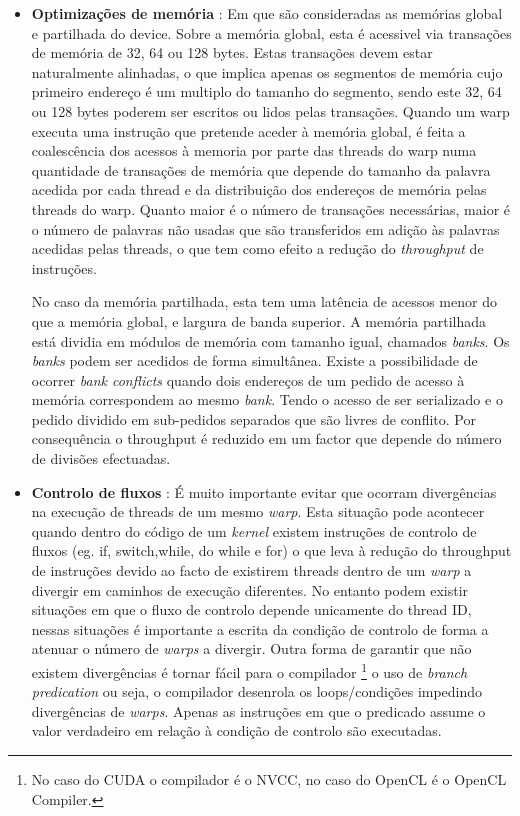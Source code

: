 \begin{itemize}
\item {\textbf{Optimizações de memória}} : Em que são consideradas as memórias global e partilhada do device.
Sobre a memória global, esta é acessivel via transações de memória de 32, 64 ou 128 bytes. Estas transações devem estar naturalmente alinhadas, o que implica apenas os segmentos de memória cujo primeiro endereço é um multiplo do tamanho do segmento, sendo este 32, 64 ou 128 bytes poderem ser escritos ou lidos pelas transações.
 Quando um warp executa uma instrução que pretende aceder à memória global, é feita a coalescência dos acessos à memoria por parte das threads do warp numa quantidade de transações de memória que depende do tamanho da palavra acedida por cada thread e da distribuição dos endereços de memória pelas threads do warp. Quanto maior é o número de transações necessárias, maior é o número de palavras não usadas que são transferidos em adição às palavras acedidas pelas threads, o que tem como efeito a redução do \textit{throughput} de instruções\cite{cpg}. \par

No caso da memória partilhada, esta tem uma latência de acessos menor do que a memória global, e largura de banda superior. A memória partilhada está dividia em módulos de memória com tamanho igual, chamados \textit{banks}. Os \textit{banks} podem ser acedidos de forma simultânea. Existe a possibilidade de ocorrer \textit{bank conflicts} quando dois endereços de um pedido de acesso à memória correspondem ao mesmo \textit{bank}.  Tendo o acesso de ser serializado e o pedido dividido em sub-pedidos separados que são livres de conflito. Por consequência o throughput é reduzido em um factor que depende do número de divisões efectuadas.

\item{\textbf{Controlo de fluxos}} : É muito importante evitar que ocorram divergências na execução de threads de um mesmo \textit{warp}. Esta situação pode acontecer quando dentro do código de um \textit{kernel} existem instruções de controlo de fluxos (eg. if, switch,while, do while e for) o que leva à redução do throughput de instruções devido ao facto de existirem threads dentro de um \textit{warp} a divergir em caminhos de execução diferentes. No entanto podem existir situações em que o fluxo de controlo depende unicamente do thread ID, nessas situações é importante a escrita da condição de controlo de forma a atenuar o número de \textit{warps} a divergir. Outra forma de garantir que não existem divergências é tornar fácil para o compilador \footnote[4]{ No caso do CUDA o compilador é o NVCC, no caso do OpenCL é o OpenCL Compiler.} o uso de \textit{branch predication} ou seja, o compilador desenrola os loops/condições impedindo divergências de \textit{warps}. Apenas as instruções em que o predicado assume o valor verdadeiro em relação à condição de controlo são executadas.
\end{itemize}


